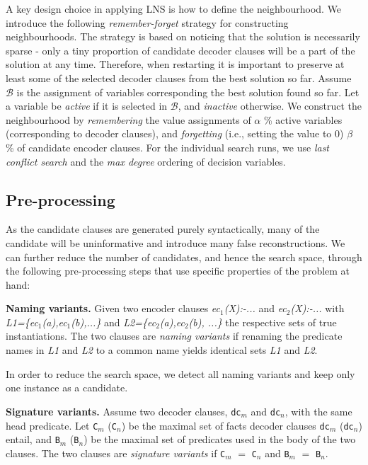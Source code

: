A key design choice in applying LNS is how to define the neighbourhood.
We introduce the following \textit{remember-forget} strategy for constructing neighbourhoods.
The strategy is based on noticing that the solution is necessarily sparse - only a tiny proportion of candidate decoder clauses will be a part of the solution at any time.
Therefore, when restarting it is important to preserve at least some of the selected decoder clauses from the best solution so far.
Assume $\mathcal{B}$ is the assignment of variables corresponding the best solution found so far.
Let a variable be \textit{active} if it is selected in $\mathcal{B}$, and \textit{inactive} otherwise.
We construct the neighbourhood by \textit{remembering} the value assignments of $\alpha$ \% active variables (corresponding to decoder clauses), and \textit{forgetting} (i.e., setting the value to 0) $\beta$ \% of candidate encoder clauses.
For the individual search runs, we use \textit{last conflict search} \cite{COS} and the \textit{max degree} ordering of decision variables.




\subsection{Pre-processing}
As the candidate clauses are generated purely syntactically, many of the candidate will be uninformative and introduce many false reconstructions.
We can further reduce the number of candidates, and hence the search space, through the following pre-processing steps that use specific properties of the problem at hand:


\begin{definition}
\textbf{Naming variants.}
Given two encoder clauses \textit{ec$_1$(X):\!-...}
and \textit{ec$_2$(X):\!-...}
with \textit{L1=\{ec$_1$(a),ec$_1$(b),...\}} and \textit{L2=\{ec$_2$(a),ec$_2$(b), ...\}} the respective sets of true instantiations.
The two clauses are \textit{naming variants} if renaming the predicate names in \textit{L1} and \textit{L2} to a common name yields identical sets \textit{L1} and \textit{L2}.
\end{definition}


In order to reduce the search space, we detect all naming variants and keep only one instance as a candidate.


\begin{definition}
\textbf{Signature variants.}
Assume two decoder clauses, \texttt{dc}$_m$ and \texttt{dc}$_n$, with the same head predicate.
Let \texttt{C}$_m$ (\texttt{C}$_n$) be the maximal set of facts decoder clauses \texttt{dc}$_m$ (\texttt{dc}$_n$) entail, and \texttt{B}$_m$ (\texttt{B}$_n$) be the maximal set of predicates used in the body of the two clauses.
The two clauses are \textit{signature variants} if \texttt{C}$_m$ $=$ \texttt{C}$_n$ and \texttt{B$_m$} $=$ \texttt{B$_n$}.
\end{definition}

